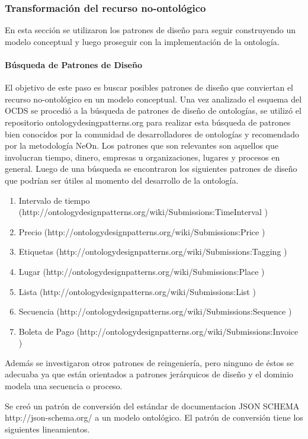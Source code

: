 \subsubsection{Transformación del recurso no-ontológico}
En esta sección se utilizaron los patrones de diseño para seguir construyendo un modelo conceptual y luego proseguir con la implementación de la ontología. 
\paragraph{Búsqueda de Patrones de Diseño}
El objetivo de este paso es buscar posibles patrones de diseño que conviertan el recurso no-ontológico en un modelo conceptual. 
Una vez analizado el esquema del OCDS se procedió a la búsqueda de patrones de diseño de ontologías, se utilizó el repositorio ontologydesingpatterns.org para realizar esta búsqueda de patrones bien conocidos por la comunidad de desarrolladores de ontologías y recomendado por la metodología NeOn.
Los patrones que son relevantes son aquellos que involucran tiempo, dinero, empresas u organizaciones, lugares y procesos en general. Luego de una búsqueda se encontraron los siguientes patrones de diseño que podrían ser útiles al momento del desarrollo de la ontología.
\begin{enumerate}
    \item Intervalo de tiempo (http://ontologydesignpatterns.org/wiki/Submissions:TimeInterval )
    \item Precio (http://ontologydesignpatterns.org/wiki/Submissions:Price )
    \item Etiquetas (http://ontologydesignpatterns.org/wiki/Submissions:Tagging )
    \item Lugar (http://ontologydesignpatterns.org/wiki/Submissions:Place )
    \item Lista (http://ontologydesignpatterns.org/wiki/Submissions:List )
    \item Secuencia (http://ontologydesignpatterns.org/wiki/Submissions:Sequence )
    \item Boleta de Pago (http://ontologydesignpatterns.org/wiki/Submissions:Invoice ) 
\end{enumerate}

Además se investigaron otros patrones de reingeniería, pero ninguno de éstos se adecuaba ya que están orientados a patrones jerárquicos de diseño y el dominio modela una secuencia o proceso. 

Se creó un patrón de conversión del estándar de documentacion JSON SCHEMA http://json-schema.org/ a un modelo ontológico. El patrón de conversión tiene los siguientes lineamientos.

